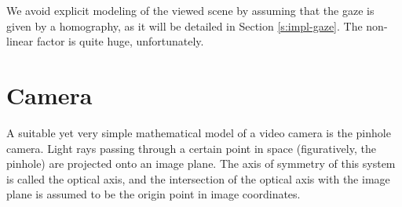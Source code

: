 We avoid explicit modeling of the viewed scene by assuming that the gaze is given by a homography, as it will be detailed in Section \ref{s:impl-gaze}.
The non-linear factor is quite huge, unfortunately.

\section{Camera}

A suitable yet very simple mathematical model of a video camera is the pinhole camera.
Light rays passing through a certain point in space (figuratively, the pinhole) are projected onto an image plane.
The axis of symmetry of this system is called the optical axis, and the intersection of the optical axis with the image plane is assumed to be the origin point in image coordinates.

